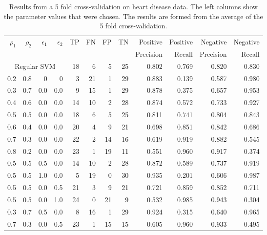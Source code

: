\documentclass[twoside,11pt]{article}
\begin{document}
          

\begin{table}[htbp]\label{table:HeartDisease1}
  \centering
    \begin{tabular}{rrrr|rrrrrrrr}
    \hline
    \multirow{2}{*}{$\rho_1$} & \multirow{2}{*}{$\rho_2$} & \multirow{2}{*}{$\epsilon_1$} & \multirow{2}{*}{$\epsilon_2$} & \multirow{2}{*}{TP}    & \multirow{2}{*}{FN}    & \multirow{2}{*}{FP}    & \multirow{2}{*}{TN} & Positive & Positive & Negative & Negative\\
    &&&&&&&&  Precision &  Recall &  Precision &  Recall \bigstrut\\
    \hline
    \hline
   \multicolumn{4}{c|}{Regular SVM} & 18    & 6     & 5     & 25    & 0.802 & 0.769 & 0.820 & 0.830 \bigstrut[t]\\
    0.2   & 0.8   & 0     & 0     & 3     & 21    & 1     & 29    & 0.883 & 0.139 & 0.587 & 0.980 \bigstrut[t]\\
    0.3   & 0.7   & 0.0   & 0.0   & 9     & 15    & 1     & 29    & 0.878 & 0.375 & 0.657 & 0.953 \\
    0.4   & 0.6   & 0.0   & 0.0   & 14    & 10    & 2     & 28    & 0.874 & 0.572 & 0.733 & 0.927 \\
    0.5   & 0.5   & 0.0   & 0.0   & 18    & 6     & 5     & 25    & 0.811 & 0.741 & 0.804 & 0.843 \\
    0.6   & 0.4   & 0.0   & 0.0   & 20    & 4     & 9     & 21    & 0.698 & 0.851 & 0.842 & 0.686 \\
    0.7   & 0.3   & 0.0   & 0.0   & 22    & 2     & 14    & 16    & 0.619 & 0.919 & 0.882 & 0.545 \\
    0.8   & 0.2   & 0.0   & 0.0   & 23    & 1     & 19    & 11    & 0.551 & 0.960 & 0.917 & 0.374 \\
    0.5   & 0.5   & 0.5   & 0.0   & 14    & 10    & 2     & 28    & 0.872 & 0.589 & 0.737 & 0.919 \\
    0.5   & 0.5   & 1.0   & 0.0   & 5     & 19    & 0     & 30    & 0.935 & 0.201 & 0.606 & 0.987 \\
    0.5   & 0.5   & 0.0   & 0.5   & 21    & 3     & 9     & 21    & 0.721 & 0.859 & 0.852 & 0.711 \\
    0.5   & 0.5   & 0.0   & 1.0   & 24    & 0     & 21    & 9     & 0.532 & 0.985 & 0.943 & 0.304 \\
    0.3   & 0.7   & 0.5   & 0.0   & 8     & 16    & 1     & 29    & 0.924 & 0.315 & 0.640 & 0.965 \\
    0.7   & 0.3   & 0.0   & 0.5   & 23    & 1     & 15    & 15    & 0.605 & 0.960 & 0.933 & 0.495 \bigstrut[b]\\
    \hline
    \hline
    \end{tabular}%
    \caption{Results from a 5 fold cross-validation on heart disease data. The left columns show the parameter values that were chosen. The results are formed from the average of the 5 fold cross-validation.}
\end{table}%
\end{document}
